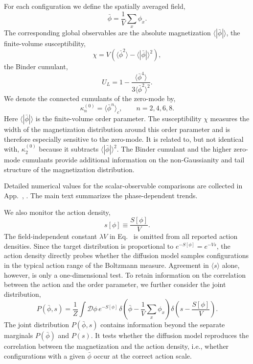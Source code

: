 \documentclass[reprint,twocolumn,superscriptaddress,preprintnumbers,amsmath,amssymb,aps,prd,floatfix]{revtex4-2}
\def\Eq#1{Eq.~\labelcref{#1}} \def\Eqs#1{Eqs.~\labelcref{#1}}
\def\App#1{App.~\labelcref{#1}}
\begin{document}
For each configuration we define the spatially averaged field,
\begin{equation}
  \bar\phi = \frac{1}{V}\sum_x \phi_x .
\end{equation}
The corresponding global observables are the absolute magnetization $\langle |\bar\phi| \rangle$, the finite-volume susceptibility,
\begin{equation}
  \chi =
  V\left(
  \langle \bar\phi^2\rangle
  - \langle |\bar\phi|\rangle^2
  \right),
\end{equation}
the Binder cumulant,
\begin{equation}
  U_L =
  1 -
  \frac{\langle \bar\phi^4\rangle}
       {3\langle \bar\phi^2\rangle^2}.
\end{equation}
We denote the connected cumulants of the zero-mode by,
\begin{equation}
  \kappa^{(0)}_n = \langle \bar\phi^n\rangle_c,
  \qquad n=2,4,6,8 .
\end{equation}
Here $\langle |\bar\phi| \rangle$ is the finite-volume order parameter. The susceptibility $\chi$ measures the width of the magnetization distribution around this order parameter and is therefore especially sensitive to the zero-mode. It is related to, but not identical with, $\kappa^{(0)}_2$ because it subtracts $\langle|\bar\phi|\rangle^2$. The Binder cumulant and the higher zero-mode cumulants provide additional information on the non-Gaussianity and tail structure of the magnetization distribution.

Detailed numerical values for the scalar-observable comparisons are collected in \App{app:numerical_tables}, . The main text summarizes the phase-dependent trends.

We also monitor the action density,
\begin{equation}
  s[\phi] \equiv \frac{S[\phi]}{V}.
  \label{eq:action_density}
\end{equation}
The field-independent constant $\lambda V$ in \Eq{eq:phi4_action} is omitted from all reported action densities. Since the target distribution is proportional to $e^{-S[\phi]}=e^{-Vs}$, the action density directly probes whether the diffusion model samples configurations in the typical action range of the Boltzmann measure. Agreement in $\langle s\rangle$ alone, however, is only a one-dimensional test. To retain information on the correlation between the action and the order parameter, we further consider the joint distribution,
\begin{equation}
P(\bar\phi,s)
=
\frac{1}{Z}
\int\!\mathcal{D}\phi\,
e^{-S[\phi]}\,
\delta\!\left(
\bar\phi-\frac{1}{V}\sum_x\phi_x
\right)
\delta\!\left(
s-\frac{S[\phi]}{V}
\right).
\label{eq:joint_ms}
\end{equation}
The joint distribution $P(\bar\phi,s)$ contains information beyond the separate marginals $P(\bar\phi)$ and $P(s)$. It tests whether the diffusion model reproduces the correlation between the magnetization and the action density, i.e., whether configurations with a given $\bar\phi$ occur at the correct action scale.
\end{document}
